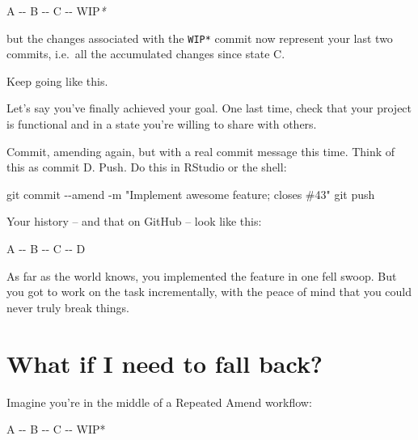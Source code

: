 \documentclass[
]{book}
\newenvironment{Shaded}{\begin{snugshade}}{\end{snugshade}}
\newcommand{\AttributeTok}[1]{\textcolor[rgb]{0.13,0.29,0.53}{#1}}
\newcommand{\ExtensionTok}[1]{#1}
\newcommand{\NormalTok}[1]{#1}
\newcommand{\PreprocessorTok}[1]{\textcolor[rgb]{0.56,0.35,0.01}{\textit{#1}}}
\begin{document}
\begin{Shaded}
\begin{Highlighting}[]
\ExtensionTok{A} \AttributeTok{{-}{-}}\NormalTok{ B }\AttributeTok{{-}{-}}\NormalTok{ C }\AttributeTok{{-}{-}}\NormalTok{ WIP}\PreprocessorTok{*}
\end{Highlighting}
\end{Shaded}

but the changes associated with the \texttt{WIP*} commit now represent your last two commits, i.e.~all the accumulated changes since state C.

Keep going like this.

Let's say you've finally achieved your goal. One last time, check that your project is functional and in a state you're willing to share with others.

Commit, amending again, but with a real commit message this time.
Think of this as commit D.
Push.
Do this in RStudio or the shell:

\begin{Shaded}
\begin{Highlighting}[]
\NormalTok{git commit {-}{-}amend {-}m "Implement awesome feature; closes \#43"}
\NormalTok{git push}
\end{Highlighting}
\end{Shaded}

Your history -- and that on GitHub -- look like this:

\begin{Shaded}
\begin{Highlighting}[]
\ExtensionTok{A} \AttributeTok{{-}{-}}\NormalTok{ B }\AttributeTok{{-}{-}}\NormalTok{ C }\AttributeTok{{-}{-}}\NormalTok{ D}
\end{Highlighting}
\end{Shaded}

As far as the world knows, you implemented the feature in one fell swoop.
But you got to work on the task incrementally, with the peace of mind that you could never truly break things.

\section{What if I need to fall back?}\label{what-if-i-need-to-fall-back}

Imagine you're in the middle of a Repeated Amend workflow:

\begin{Shaded}
\begin{Highlighting}[]
\NormalTok{A {-}{-} B {-}{-} C {-}{-} WIP*}
\end{Highlighting}
\end{Shaded}
\end{document}
